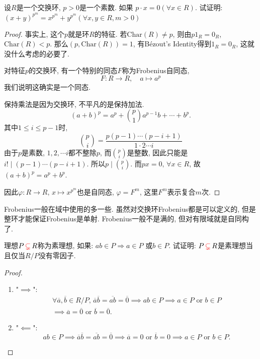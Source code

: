 \documentclass{../solutions-cn}
\begin{document}
\begin{exercise}[习题2.1.2]
    设$R$是一个交换环, $p > 0$是一个素数. 如果
$p \cdot x = 0 (\forall x\in R)$. 试证明: 
$(x + y)^{p^m} = x^{p^m}+y^{p^m} (\forall x, y \in R, m > 0)$
\end{exercise}

\begin{proof}
    事实上, 这个$p$就是环$R$的特征. 若$\mathrm{Char}(R) \neq p$, 则由$p1_R = 0_R$, $\mathrm{Char}(R) < p$.
    那么$(p, \mathrm{Char}(R)) = 1$, 有Bézout's Identity得到$1_R = 0_R$, 这就没什么考虑的必要了.

    对特征$p$的交换环, 有一个特别的同态$F$称为Frobenius自同态,
    \[
        F: R \to R, \quad a \mapsto a^p
    \]
    我们说明这确实是一个同态.
    
    保持乘法是因为交换环, 不平凡的是保持加法.
    \[
        (a + b)^p = a^p + \binom{p}{1}a^{p - 1}b + \cdots + b^p.
    \]
    其中$1 \leqslant i \leqslant p - 1$时,
    \[
        \binom{p}{i} = \frac{p(p - 1) \cdots (p - i + 1)}{1 \cdot 2 \cdots i} 
    \]
    由于$p$是素数, $1, 2, \cdots i$都不整除$p$, 而$\binom{p}{i}$是整数, 因此只能是$i! \mid (p - 1) \cdots (p - i + 1)$. 所以$p \mid \binom{p}{i}$. 而$px = 0,\, \forall x \in R$, 故$(a + b)^p = a^p + b^p$.

    因此$\varphi: R \to R,\, x \mapsto x^{p^m}$也是自同态, $\varphi = F^m$, 这里$F^m$表示复合$m$次.
\end{proof}

\begin{remark}
    Frobenius一般在域中使用的多一些. 虽然对交换环Frobenius都是可以定义的, 但是整环才能保证Frobenius是单射. Frobenius一般不是满的, 但对有限域就是自同构了.
\end{remark}

\begin{exercise}[习题2.1.5]
    理想\(P \,\textcolor{red}{\subsetneq}\, R\)称为素理想, 如果: $ab \in P \Rightarrow a \in P$
或$b \in P$. 试证明: 
\(P \,\textcolor{red}{\subsetneq}\, R\)是素理想当且仅当$R/P$没有零因子.
\end{exercise}

\begin{proof}
    \begin{enumerate}[(1)]
        \item "$\implies$":
        \[
        \begin{gathered}
            \forall \overline{a}, \overline{b} \in R/P,\, \overline{a}\overline{b} = \overline{ab} = \overline{0} \implies ab \in P \implies a \in P \text{ or } b \in P \\ \implies \overline{a} = \overline{0} \text{ or } \overline{b} = \overline{0}.
        \end{gathered}
        \]
        \item "$\impliedby$":
        \[
            ab \in P \implies \overline{a}\overline{b} = \overline{ab} = \overline{0} \implies \overline{a} = 0 \text{ or } \overline{b} = 0 \implies a \in P \text{ or } b \in P.
        \]
    \end{enumerate} 
\end{proof}
\end{document}
